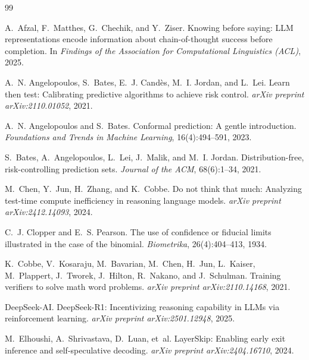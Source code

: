 \documentclass[11pt]{article}
\begin{document}
\begin{thebibliography}{99}

A.~Afzal, F.~Matthes, G.~Chechik, and Y.~Ziser.
\newblock Knowing before saying: LLM representations encode information about chain-of-thought success before completion.
\newblock In \emph{Findings of the Association for Computational Linguistics (ACL)}, 2025.

A.~N. Angelopoulos, S.~Bates, E.~J. Cand{\`e}s, M.~I. Jordan, and L.~Lei.
\newblock Learn then test: Calibrating predictive algorithms to achieve risk control.
\newblock \emph{arXiv preprint arXiv:2110.01052}, 2021.

A.~N. Angelopoulos and S.~Bates.
\newblock Conformal prediction: A gentle introduction.
\newblock \emph{Foundations and Trends in Machine Learning}, 16(4):494--591, 2023.

S.~Bates, A.~Angelopoulos, L.~Lei, J.~Malik, and M.~I. Jordan.
\newblock Distribution-free, risk-controlling prediction sets.
\newblock \emph{Journal of the ACM}, 68(6):1--34, 2021.

M.~Chen, Y.~Jun, H.~Zhang, and K.~Cobbe.
\newblock Do not think that much: Analyzing test-time compute inefficiency in reasoning language models.
\newblock \emph{arXiv preprint arXiv:2412.14093}, 2024.

C.~J. Clopper and E.~S. Pearson.
\newblock The use of confidence or fiducial limits illustrated in the case of the binomial.
\newblock \emph{Biometrika}, 26(4):404--413, 1934.

K.~Cobbe, V.~Kosaraju, M.~Bavarian, M.~Chen, H.~Jun, L.~Kaiser, M.~Plappert, J.~Tworek, J.~Hilton, R.~Nakano, and J.~Schulman.
\newblock Training verifiers to solve math word problems.
\newblock \emph{arXiv preprint arXiv:2110.14168}, 2021.

{DeepSeek-AI}.
\newblock DeepSeek-R1: Incentivizing reasoning capability in LLMs via reinforcement learning.
\newblock \emph{arXiv preprint arXiv:2501.12948}, 2025.

M.~Elhoushi, A.~Shrivastava, D.~Luan, et~al.
\newblock LayerSkip: Enabling early exit inference and self-speculative decoding.
\newblock \emph{arXiv preprint arXiv:2404.16710}, 2024.


\end{thebibliography}
\end{document}
